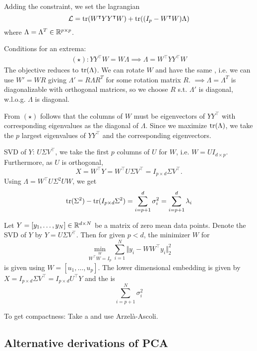 Adding the constraint, we set the lagrangian 
\[\mathcal{L}=\text{tr}(W^\intercal YY^\intercal W)+\text{tr}((I_p-W^\intercal W)\Lambda)\]
where $\Lambda=\Lambda^T\in\mathbb{R}^{p\times p}$.

Conditions for an extrema:
\begin{align*}
    (\star):YY^\intercal W = W\Lambda\implies \Lambda=W^\intercal YY^\intercal W
\end{align*}
The objective reduces to $\text{tr}(\Lambda)$. We can rotate $W$ and have the same ,
i.e. we can use $W'=WR$ giving $\Lambda'=R\Lambda R^T$ for some rotation matrix $R$.
$\implies \Lambda=\Lambda^T$ is diagonalizable with orthogonal matrices, so we choose $R$ s.t. 
$\Lambda'$ is diagonal, w.l.o.g. $\Lambda$ is diagonal.

From $(\star)$ follows that the columns of $W$ must be eigenvectors of $YY^\intercal$ with 
corresponding eigenvalues as the diagonal of $\Lambda$. Since we maximize $\text{tr}(\Lambda)$, we 
take the $p$ largest eigenvalues of $YY^\intercal$ and the corresponding eigenvectors.

SVD of $Y$: $U\Sigma V^\intercal$, we take the first $p$ columns of $U$ for $W$, i.e. $W=UI_{d\times p}$.
Furthermore, as $U$ is orthogonal,
\[X=W^\intercal Y=W^\intercal U \Sigma V^\intercal=I_{p\times d}\Sigma V^\intercal.\]
Using $\Lambda=W^\intercal U\Sigma^2 U W$, we get 
\[\text{tr}(\Sigma^2)-\text{tr}(I_{p\times d}\Sigma^2)=\sum_{i=p+1}^d \sigma_i^2=\sum_{i=p+1}^d \lambda_i\]

\begin{theorem}\label{thm:2.1}
    Let $Y=[y_1,\dots,y_N]\in\mathbb{R}^{d\times N}$ be a matrix of zero mean data points. Denote the SVD of 
    $Y$ by $Y=U\Sigma V^\intercal$. Then for given $p<d$, the minimizer $W$ for 
    \[\min_{\stackrel{W}{W^\intercal W=I_p}}\sum_{i=1}^N\Vert y_i-WW^\intercal y_i\Vert_2^2\]
    is given using $W=[u_1,\dots,u_p]$. The lower dimensional embedding is given by 
    $X=I_{p\times d}\Sigma V^\intercal=I_{p\times d}U^\intercal Y$ and the  
    is \[\sum_{i=p+1}^N\sigma_i^2\]
\end{theorem}


To get compactness: Take a and use Arzelà-Ascoli. %


\subsection{Alternative derivations of PCA}

